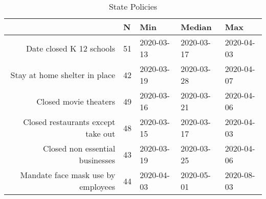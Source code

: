 \begin{table}[ht]
\centering
\begin{tabular}{rllll}
  \hline
 & N & Min & Median & Max \\ 
  \hline
Date closed K 12 schools & 51 & 2020-03-13 & 2020-03-17 & 2020-04-03 \\ 
  Stay at home  shelter in place & 42 & 2020-03-19 & 2020-03-28 & 2020-04-07 \\ 
  Closed movie theaters & 49 & 2020-03-16 & 2020-03-21 & 2020-04-06 \\ 
  Closed restaurants except take out & 48 & 2020-03-15 & 2020-03-17 & 2020-04-03 \\ 
  Closed non essential businesses & 43 & 2020-03-19 & 2020-03-25 & 2020-04-06 \\ 
  Mandate face mask use by employees & 44 & 2020-04-03 & 2020-05-01 & 2020-08-03 \\ 
   \hline
\end{tabular}
\caption{State Policies \label{tab:policies_inreg}} 
\end{table}
